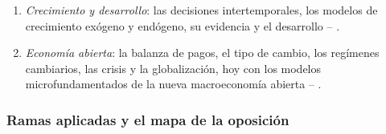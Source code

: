 \documentclass[11pt]{article}
\begin{document}
\begin{itemize}
\begin{enumerate}
  \item \emph{Crecimiento y desarrollo}: las decisiones intertemporales, los modelos de crecimiento exógeno y endógeno, su evidencia y el desarrollo  -- .
  \item \emph{Economía abierta}: la balanza de pagos, el tipo de cambio, los regímenes cambiarios, las crisis y la globalización, hoy con los modelos microfundamentados de la nueva macroeconomía abierta   -- .
  \end{enumerate}
\end{itemize}

\subsubsection{Ramas aplicadas y el mapa de la oposición}\label{sec:ramas-aplicadas}
\end{document}
